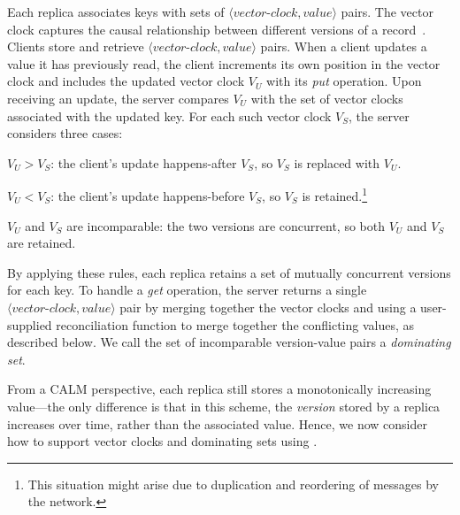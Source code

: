 Each replica associates keys with sets of
$\langle\textit{vector-clock},\textit{value}\rangle$ pairs. The vector clock
captures the causal relationship between different versions of a
record~\cite{Fidge1988,Mattern1989}. Clients store and retrieve
$\langle\textit{vector-clock},\textit{value}\rangle$ pairs. When a client
updates a value it has previously read, the client increments its own position
in the vector clock and includes the updated vector clock $V_U$ with its
\emph{put} operation. Upon receiving an update, the server compares $V_U$ with
the set of vector clocks associated with the updated key. For each such vector
clock $V_S$, the server considers three cases:
\begin{compactenum}
\item $V_U > V_S$: the client's update happens-after $V_S$, so $V_S$ is replaced
  with $V_U$.
\item $V_U < V_S$: the client's update happens-before $V_S$, so $V_S$ is
  retained.\footnote{This situation might arise due to duplication and
    reordering of messages by the network.}
\item $V_U$ and $V_S$ are incomparable: the two versions are concurrent, so
  both $V_U$ and $V_S$ are retained.
\end{compactenum}
By applying these rules, each replica retains a set of mutually concurrent
versions for each key. To handle a \emph{get} operation, the server returns a
single $\langle\textit{vector-clock},\textit{value}\rangle$ pair by merging
together the vector clocks and using a user-supplied reconciliation function to
merge together the conflicting values, as described below. We call the set of
incomparable version-value pairs a \emph{dominating set}.

From a CALM perspective, each replica still stores a monotonically increasing
value---the only difference is that in this scheme, the \emph{version} stored by
a replica increases over time, rather than the associated value. Hence, we now
consider how to support vector clocks and dominating sets using \lang.

